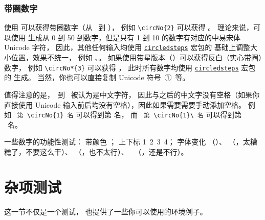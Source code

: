 \subsubsection{带圈数字}
使用 \texttt{\string\circNo} 可以获得带圈数字（从 \ 到 ），
例如 \verb|\circNo{2}| 可以获得 。
理论来说，可以使用 \texttt{\string\circNo} 生成从 0 到 50 到数字，但是只有 1 到 10 的数字有对应的中易宋体 Unicode 字符，
因此，其他任何输入均使用 \href{https://ctan.org/pkg/circledsteps}{\texttt{circledsteps}} 宏包的 \texttt{\string\CircleText} 基础上调整大小位置，效果不统一，
例如 、。
如果使用带星版本（\texttt{\string\circNo*}）可以获得反白（实心带圈）数字，
例如 \verb|\circNo*{3}| 可以获得 ，
此时所有数字均使用 \href{https://ctan.org/pkg/circledsteps}{\texttt{circledsteps}} 宏包的 \texttt{\string\Circle} 生成。
当然，你也可以直接复制 Unicode 符号\ ①\ 等。

值得注意的是，\ 到 \ 被认为是中文字符，
因此与之后的中文字没有空格（如果你直接使用 Unicode 输入前后均没有空格），因此如果需要需要手动添加空格。
例如 {\color{Blue}\ \verb|第 \circNo{1} 名|} 可以得到第  名，
而 {\color{Blue}\ \verb|第 \circNo{1}\ 名|} 可以得到第 \ 名。

一些数字的功能性测试：
带颜色 \textcolor{red}{     }；
上下标 1\textsuperscript{}\ 2\textsuperscript{}\ 3\textsubscript{}\ 4\textsubscript{}；
字体变化 \textsf{  }（\texttt{\string\ttfamily}）、
\textit{  }（\texttt{\string\itshape}，太糟糕了，不要这么干）、
\textbf{  }（\texttt{\string\bfseries}，也不太行）、
\texttt{  }（\texttt{\string\ttfamily}，还是不行）。

\section{杂项测试}
这一节不仅是一个测试，
也提供了一些你可以使用的环境例子。

